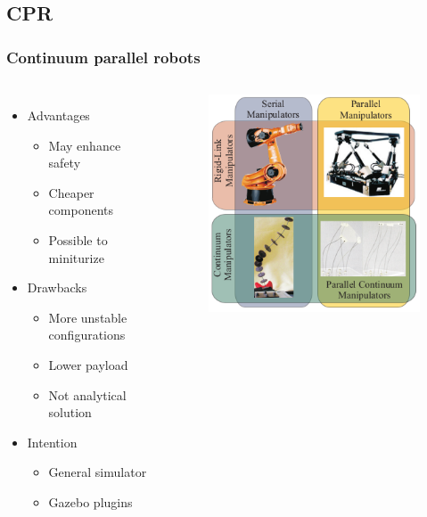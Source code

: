 \documentclass[compress]{thesisbeamer}
\begin{document}
        \subsection{CPR}
        \begin{frame}
        	\frametitle{Continuum parallel robots}
			\begin{columns}
			\begin{itemize}%
  				\item Advantages
  				\begin{itemize}%
   					\item May enhance safety
   					\item Cheaper components 
   					\item Possible to miniturize
  				\end{itemize}
  				\item Drawbacks
  				\begin{itemize}%
   					\item More unstable configurations
   					\item Lower payload
   					\item Not analytical solution
  				\end{itemize}
  				\item Intention
  				\begin{itemize}
  					\item General simulator
  					\item Gazebo plugins
  				\end{itemize}
 			\end{itemize}
			\vspace{2cm}
			\begin{figure}[h]
				\centering
				\includegraphics[width=\textwidth]{images/serial_parall_robots}

\end{figure}
\end{columns}
\end{frame}
\end{document}

